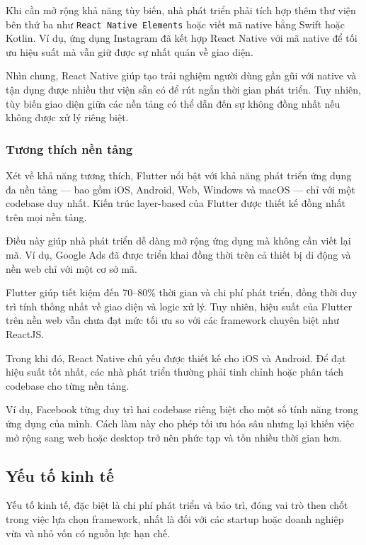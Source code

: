 \indent Khi cần mở rộng khả năng tùy biến, nhà phát triển phải tích hợp thêm thư viện bên thứ ba như \texttt{React Native Elements} hoặc viết mã native bằng Swift hoặc Kotlin. Ví dụ, ứng dụng Instagram đã kết hợp React Native với mã native để tối ưu hiệu suất mà vẫn giữ được sự nhất quán về giao diện.

\indent Nhìn chung, React Native giúp tạo trải nghiệm người dùng gần gũi với native và tận dụng được nhiều thư viện sẵn có để rút ngắn thời gian phát triển. Tuy nhiên, tùy biến giao diện giữa các nền tảng có thể dẫn đến sự không đồng nhất nếu không được xử lý riêng biệt.

\subsubsection{Tương thích nền tảng}

\hspace*{1.3em} Xét về khả năng tương thích, Flutter nổi bật với khả năng phát triển ứng dụng đa nền tảng — bao gồm iOS, Android, Web, Windows và macOS — chỉ với một codebase duy nhất. Kiến trúc layer-based của Flutter được thiết kế đồng nhất trên mọi nền tảng.

\indent Điều này giúp nhà phát triển dễ dàng mở rộng ứng dụng mà không cần viết lại mã. Ví dụ, Google Ads đã được triển khai đồng thời trên cả thiết bị di động và nền web chỉ với một cơ sở mã.

\indent Flutter giúp tiết kiệm đến 70–80\% thời gian và chi phí phát triển, đồng thời duy trì tính thống nhất về giao diện và logic xử lý. Tuy nhiên, hiệu suất của Flutter trên nền web vẫn chưa đạt mức tối ưu so với các framework chuyên biệt như ReactJS.

\indent Trong khi đó, React Native chủ yếu được thiết kế cho iOS và Android. Để đạt hiệu suất tốt nhất, các nhà phát triển thường phải tinh chỉnh hoặc phân tách codebase cho từng nền tảng.

\indent Ví dụ, Facebook từng duy trì hai codebase riêng biệt cho một số tính năng trong ứng dụng của mình. Cách làm này cho phép tối ưu hóa sâu nhưng lại khiến việc mở rộng sang web hoặc desktop trở nên phức tạp và tốn nhiều thời gian hơn.



\subsection{Yếu tố kinh tế}


    \hspace*{0.8cm}Yếu tố kinh tế, đặc biệt là chi phí phát triển và bảo trì, đóng vai trò then chốt trong việc lựa chọn framework, nhất là đối với các startup hoặc doanh nghiệp vừa và nhỏ vốn có nguồn lực hạn chế.
\vspace{0.5em}

